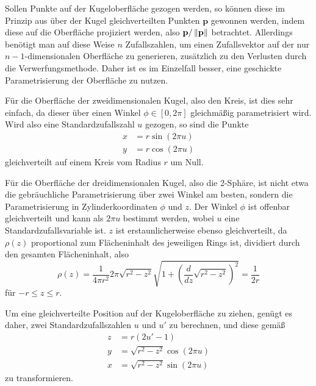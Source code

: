 Sollen Punkte auf der Kugeloberfläche gezogen werden, so können diese
im Prinzip aus über der Kugel gleichverteilten Punkten $\mathbf p$
gewonnen werden, indem diese auf die Oberfläche projiziert werden,
also $\mathbf p/\left\lVert{\mathbf p}\right\rVert$ betrachtet. Allerdings benötigt man
auf diese Weise $n$ Zufallszahlen, um einen Zufallsvektor auf der nur
$n-1$-dimensionalen Oberfläche zu generieren, zusätzlich zu den
Verlusten durch die Verwerfungsmethode. Daher ist es im Einzelfall
besser, eine geschickte Parametrisierung der Oberfläche zu nutzen.

Für die Oberfläche der zweidimensionalen Kugel, also den Kreis, ist
dies sehr einfach, da dieser über einen Winkel $\phi\in [0,2\pi]$
gleichmäßig parametrisiert wird. Wird also eine Standardzufallszahl
$u$ gezogen, so sind die Punkte
\begin{equation}
  \begin{split}
    x &= r\sin(2\pi u)\\
    y &= r\cos(2\pi u)
  \end{split}
\end{equation}
gleichverteilt auf einem Kreis vom Radius $r$ um Null.

Für die Oberfläche der dreidimensionalen Kugel, also die 2-Sphäre, ist
nicht etwa die gebräuchliche Parametrisierung über zwei Winkel am
besten, sondern die Parametrisierung in Zylinderkoordinaten $\phi$ und
$z$.  Der Winkel $\phi$ ist offenbar gleichverteilt und kann als $2\pi
u$ bestimmt werden, wobei $u$ eine Standardzufallsvariable ist.  $z$
ist erstaunlicherweise ebenso gleichverteilt, da $\rho(z)$
proportional zum Flächeninhalt des jeweiligen Rings ist, dividiert
durch den gesamten Flächeninhalt, also
\begin{equation}
  \rho(z) = \frac{1}{4\pi r^2} 2\pi \sqrt{r^2 - z^2} \sqrt{1 +
    \left(\frac{d}{dz}\sqrt{r^2 - z^2}\right)^2} = \frac{1}{2r}
\end{equation}
für $-r\le z\le r$.

Um eine gleichverteilte Position auf der Kugeloberfläche zu ziehen,
genügt es daher, zwei Standardzufallszahlen $u$ und $u'$ zu
berechnen, und diese gemäß
\begin{equation}
  \label{eq:2sphere}
  \begin{split}
    z &= r(2u' - 1)\\
    y &= \sqrt{r^2-z^2}\cos(2\pi u)\\
    x &= \sqrt{r^2-z^2}\sin(2\pi u)
  \end{split}
\end{equation}
zu transformieren.

